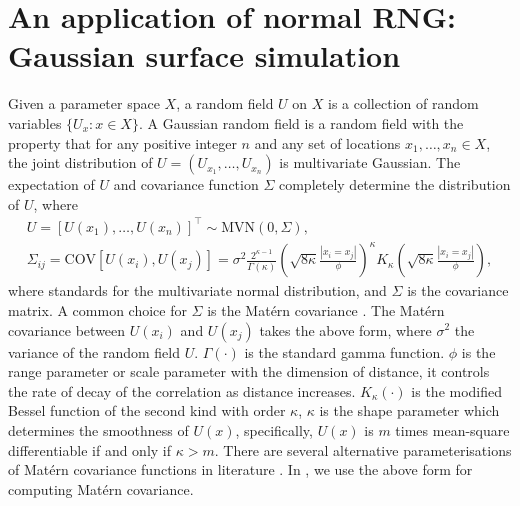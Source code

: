 \documentclass[article,nojss]{jss}\usepackage[]{graphicx}\usepackage[]{color}
\def\cov{{\text{COV}}}
\begin{document}
\section{An application of normal RNG: Gaussian surface simulation} 
Given a parameter space $X$, a random field $U$ on $X$ is a collection of random variables $\{U_x :x\in X\}$. A Gaussian random field is a random field with the property that for any positive integer $n$ and any set of locations $x_1,\dots,x_n \in X$, the joint distribution of $U=(U_{x_1},\dots,U_{x_n})$ is multivariate Gaussian. The expectation of $U$ and covariance function $\Sigma$ completely determine the distribution of $U$, where 
\begin{gather*} 
U = [U(x_1), \ldots, U(x_n)]^\top \sim \text{MVN}(0, \Sigma), \\
\Sigma_{ij} = \cov[ U(x_i),U(x_j) ] = \sigma^2 \frac{2^{\kappa-1}}{\Gamma(\kappa)} \left(\sqrt{8\kappa} \frac{|x_i = x_j|}{\phi}\right)^\kappa  K_\kappa\left(\sqrt{8\kappa}  \frac{|x_i = x_j|}{\phi}\right),
\end{gather*}
where  standards for the multivariate normal distribution, and $\Sigma$ is the covariance matrix. A common choice for $\Sigma$ is the Mat\'ern covariance \citep{matern1960spatial}. The Mat\'ern covariance between $U(x_i)$ and $U(x_j)$ takes the above form,
where $\sigma^2$ the variance of the random field $U$.
$\Gamma(\cdot)$ is the standard gamma function.  
$\phi$ is the range parameter or scale parameter with the dimension of distance, it controls the rate of decay of the correlation as distance increases. $K_\kappa(\cdot)$ is the modified Bessel function of the second kind with order $\kappa$, $\kappa$ is the shape parameter which determines the smoothness of $U(x)$, specifically, $U(x)$ is $m$ times mean-square differentiable if and only if $\kappa > m$. %
There are several alternative parameterisations of Mat\'ern covariance functions in literature  \citep[see][]{haskard2007anisotropic}. In , we use the above form for computing Mat\'ern covariance.
\end{document}
